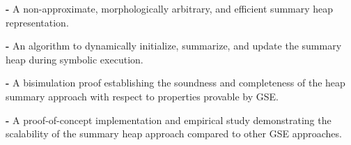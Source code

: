 






\begin{compactdesc}


\item\textbf{-} A non-approximate, morphologically arbitrary, and efficient 
summary heap representation.

\item\textbf{-} An algorithm to dynamically initialize, summarize, and
  update the summary heap during symbolic execution.

\item\textbf{-} A bisimulation proof establishing the soundness and 
completeness of the heap summary approach with respect to
properties provable by GSE.

\item\textbf{-} A proof-of-concept implementation and empirical study 
demonstrating the scalability of the summary heap approach
compared to other GSE approaches.

\end{compactdesc}


